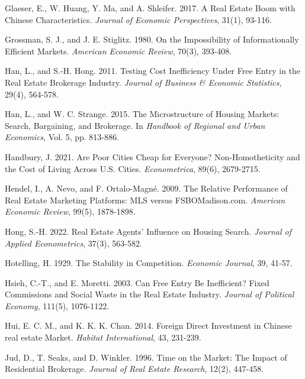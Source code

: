 \documentclass[11pt]{article}
\begin{document}
\begin{singlespace}
\begin{thebibliography}{}
Glaeser, E., W. Huang, Y. Ma, and A. Shleifer. 2017. A Real Estate Boom with Chinese Characteristics. \textit{Journal of Economic Perspectives}, 31(1), 93-116. 

Grossman, S. J., and J. E. Stiglitz. 1980. On the Impossibility of Informationally Efficient Markets. \textit{American Economic Review}, 70(3), 393-408. 

Han, L., and S.-H. Hong. 2011. Testing Cost Inefficiency Under Free Entry in the Real Estate Brokerage Industry. \textit{Journal of Business \& Economic Statistics}, 29(4), 564-578. 

Han, L., and W. C. Strange. 2015. The Microstructure of Housing Markets: Search, Bargaining, and Brokerage. In \textit{Handbook of Regional and Urban Economics}, Vol. 5, pp. 813-886. 

Handbury, J. 2021. Are Poor Cities Cheap for Everyone? Non-Homotheticity and the Cost of Living Across U.S. Cities. \textit{Econometrica}, 89(6), 2679-2715. 

Hendel, I., A. Nevo, and F. Ortalo-Magné. 2009. The Relative Performance of Real Estate Marketing Platforms: MLS versus FSBOMadison.com. \textit{American Economic Review}, 99(5), 1878-1898. 

Hong, S.-H. 2022. Real Estate Agents' Influence on Housing Search. \textit{Journal of Applied Econometrics}, 37(3), 563-582. 

Hotelling, H. 1929. The Stability in Competition. \textit{Economic Journal}, 39, 41-57. 

Hsieh, C.-T., and E. Moretti. 2003. Can Free Entry Be Inefficient? Fixed Commissions and Social Waste in the Real Estate Industry. \textit{Journal of Political Economy}, 111(5), 1076-1122. 

Hui, E. C. M., and K. K. K. Chan. 2014. Foreign Direct Investment in Chinese real estate Market. \textit{Habitat International}, 43, 231-239. 

Jud, D., T. Seaks, and D. Winkler. 1996. Time on the Market: The Impact of Residential Brokerage. \textit{Journal of Real Estate Research}, 12(2), 447-458. 


\end{thebibliography}
\end{singlespace}
\end{document}
